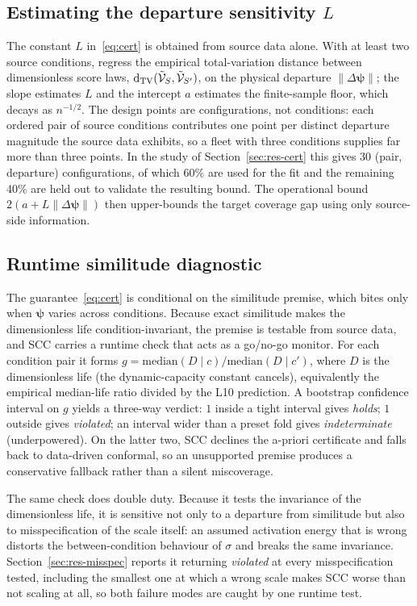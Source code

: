 \subsection{Estimating the departure sensitivity $L$}\label{sec:estL}
The constant $L$ in~\eqref{eq:cert} is obtained from source data alone. With at least two source
conditions, regress the empirical total-variation distance between dimensionless score laws,
$\operatorname{d_{\mathrm{TV}}}(\tilde{\mathcal V}_S,\tilde{\mathcal V}_{S'})$, on the physical departure
$\lVert\Delta\boldsymbol\psi\rVert$; the slope estimates $L$ and the intercept $a$ estimates the
finite-sample floor, which decays as $n^{-1/2}$. The design points are configurations, not conditions:
each ordered pair of source conditions contributes one point per distinct departure magnitude the
source data exhibits, so a fleet with three conditions supplies far more than three points. In the
study of Section~\ref{sec:res-cert} this gives 30 (pair, departure) configurations, of which 60\% are
used for the fit and the remaining 40\% are held out to validate the resulting bound. The operational bound
$2(a+L\lVert\Delta\boldsymbol\psi\rVert)$ then upper-bounds the target coverage gap using only
source-side information.

\subsection{Runtime similitude diagnostic}\label{sec:diagnostic}
The guarantee~\eqref{eq:cert} is conditional on the similitude premise, which bites only when
$\boldsymbol\psi$ varies across conditions. Because exact similitude makes the dimensionless life
condition-invariant, the premise is testable from source data, and SCC carries a runtime check that
acts as a go/no-go monitor. For each condition pair it forms
$g=\mathrm{median}(D\mid c)/\mathrm{median}(D\mid c')$, where $D$ is the dimensionless life (the
dynamic-capacity constant cancels), equivalently the empirical median-life ratio divided by the L10
prediction. A bootstrap confidence interval on $g$ yields a three-way verdict: $1$ inside a tight
interval gives \emph{holds}; $1$ outside gives \emph{violated}; an interval wider than a preset fold
gives \emph{indeterminate} (underpowered). On the latter two, SCC declines the a-priori certificate
and falls back to data-driven conformal, so an unsupported premise produces a conservative fallback
rather than a silent miscoverage.

The same check does double duty. Because it tests the invariance of the dimensionless life, it is
sensitive not only to a departure from similitude but also to misspecification of the scale itself:
an assumed activation energy that is wrong distorts the between-condition behaviour of $\sigma$ and
breaks the same invariance. Section~\ref{sec:res-misspec} reports it returning \emph{violated} at
every misspecification tested, including the smallest one at which a wrong scale makes SCC worse
than not scaling at all, so both failure modes are caught by one runtime test.
